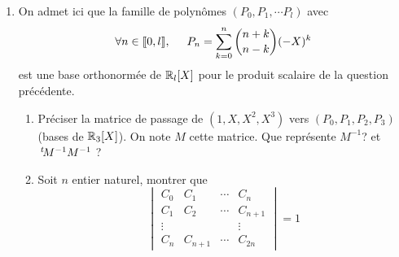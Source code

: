 \begin{enumerate}
\item  On admet ici que la famille de polynômes $(P_0, P_1,\cdots P_l)$ avec
\begin{displaymath}
  \forall n \in \llbracket 0, l \rrbracket, \hspace{0.5cm}
P_n = \sum_{k=0}^n \binom{n+k}{n-k} (-X)^k  
\end{displaymath}
est une base orthonormée de $\mathbb{R}_l[X]$ pour le produit scalaire de la question précédente.
\begin{enumerate}
  \item Préciser la matrice de passage de $(1,X,X^2,X^3)$ vers $(P_0,P_1,P_2,P_3)$ (bases de $\mathbb{R}_3[X]$). On note $M$ cette matrice. Que représente $M^{-1}$? et $\,\mathstrut^t\! M^{-1} M^{-1}$ ? 
  \item Soit $n$ entier naturel, montrer que 
\begin{displaymath}
\begin{vmatrix}
C_0    & C_1     & \cdots & C_n     \\
C_1    & C_2     & \cdots & C_{n+1} \\
\vdots &         &        & \vdots  \\
C_{n}  & C_{n+1} & \cdots & C_{2n}
\end{vmatrix}
=1
\end{displaymath}


\end{enumerate}


\end{enumerate}